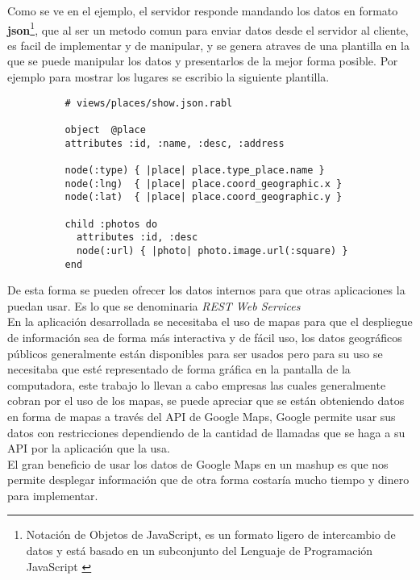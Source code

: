       Como se ve en el ejemplo, el servidor responde mandando los datos en formato \textbf{json}\footnote{Notación de Objetos de JavaScript, es un formato ligero de intercambio de datos y  está basado en un subconjunto del Lenguaje de Programación JavaScript \cite{json}}, que al ser un metodo comun para enviar datos desde el servidor al cliente, es facil de implementar y de manipular, y se genera atraves de una plantilla 
      en la que se puede manipular los datos y presentarlos de la mejor forma posible. Por ejemplo para mostrar los lugares se escribio la siguiente plantilla.

      \begin{center}
        \begin{verbatim}
          # views/places/show.json.rabl

          object  @place
          attributes :id, :name, :desc, :address

          node(:type) { |place| place.type_place.name }
          node(:lng)  { |place| place.coord_geographic.x }
          node(:lat)  { |place| place.coord_geographic.y }

          child :photos do 
            attributes :id, :desc
            node(:url) { |photo| photo.image.url(:square) }
          end
        \end{verbatim}
      \end{center}


      De esta forma se pueden ofrecer los datos internos para que otras aplicaciones la puedan usar. Es lo que se denominaria \emph{REST Web Services}\\


      En la aplicación desarrollada se necesitaba el uso de mapas para que el 
      despliegue de información sea de forma más interactiva y de fácil uso, 
      los datos geográficos públicos generalmente están disponibles para ser 
      usados pero para su uso se necesitaba que esté representado de forma gráfica 
      en la pantalla de la computadora, este trabajo lo llevan a cabo empresas 
      las cuales generalmente cobran por el uso de los mapas, se puede  apreciar 
      que se están obteniendo datos en forma de mapas a través del API de Google Maps, 
      Google permite usar sus datos con restricciones dependiendo de la cantidad 
      de llamadas que se haga a su API por la aplicación que la usa.\\

      El gran beneficio de usar los datos de Google Maps en un mashup es que nos 
      permite desplegar información que de otra forma costaría mucho tiempo y dinero para implementar.\\


